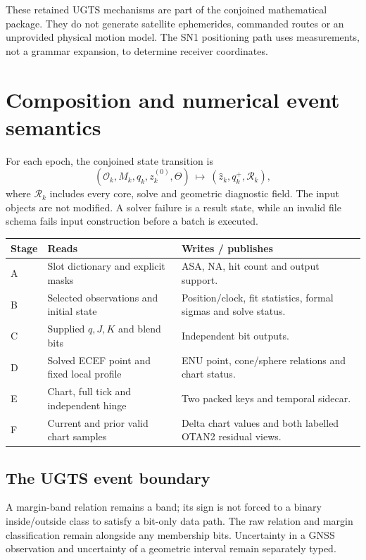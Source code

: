 \documentclass[11pt,a4paper]{article}
\begin{document}
These retained UGTS mechanisms are part of the conjoined mathematical package. They do not generate
satellite ephemerides, commanded routes or an unprovided physical motion model. The SN1 positioning path
uses measurements, not a grammar expansion, to determine receiver coordinates.
\clearpage

\section{Composition and numerical event semantics}
For each epoch, the conjoined state transition is
\begin{equation}
(\mathcal O_k,M_k,q_k,z_k^{(0)},\Theta)
\ \longmapsto\ (\hat z_k,q_k^+,\mathcal R_k),
\end{equation}
where $\mathcal R_k$ includes every core, solve and geometric diagnostic field. The input objects are not
modified. A solver failure is a result state, while an invalid file schema fails input construction before a
batch is executed.

\par\small
\begin{tabularx}{\textwidth}{@{}P{.10\textwidth}P{.33\textwidth}Y@{}}\toprule
\textbf{Stage} & \textbf{Reads} & \textbf{Writes / publishes}\\\midrule
A & Slot dictionary and explicit masks & ASA, NA, hit count and output support.\\
B & Selected observations and initial state & Position/clock, fit statistics, formal sigmas and solve status.\\
C & Supplied $q,J,K$ and blend bits & Independent bit outputs.\\
D & Solved ECEF point and fixed local profile & ENU point, cone/sphere relations and chart status.\\
E & Chart, full tick and independent hinge & Two packed keys and temporal sidecar.\\
F & Current and prior valid chart samples & Delta chart values and both labelled OTAN2 residual views.\\\bottomrule
\end{tabularx}
\par\normalsize

\subsection{The UGTS event boundary}
A margin-band relation remains a band; its sign is not forced to a binary inside/outside class to satisfy a
bit-only data path. The raw relation and margin classification remain alongside any membership bits.
Uncertainty in a GNSS observation and uncertainty of a geometric interval remain separately typed.
\end{document}
